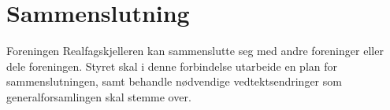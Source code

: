 \section{Sammenslutning} \label{sammenslutning}

Foreningen Realfagskjelleren kan sammenslutte seg med andre foreninger eller dele foreningen.
Styret skal i denne forbindelse utarbeide en plan for sammenslutningen, samt behandle nødvendige vedtektsendringer som generalforsamlingen skal stemme over.